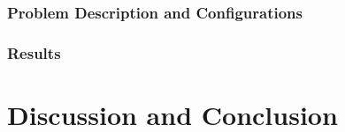 \documentclass[font=STIX2]{gw-dissertation}[2021/11/19]
\begin{document}
        \subsection{Problem Description and Configurations}
        \label{sec:pinn-2d-cylinder-re200-conf}
        

        \subsection{Results}
        \label{sec:pinn-2d-cylinder-re200-results}
        

\chapter{Discussion and Conclusion}\label{chap:discussion}


\sloppy
\printbibliography[heading=bibintoc, title=References]
\fussy
\end{document}
